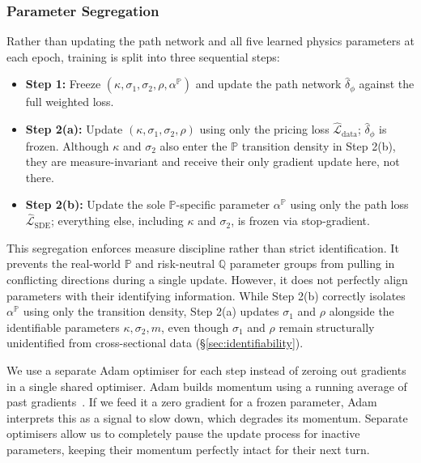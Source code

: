 \documentclass[sigconf, authorversion=true, nonacm=true]{acmart}
\begin{document}
\subsubsection{Parameter Segregation}
\label{sec:alternating}

Rather than updating the path network and all five learned physics
parameters at each epoch, training is split into three sequential steps:
\begin{itemize}
    \item \textbf{Step 1:} Freeze $(\kappa, \sigma_1, \sigma_2, \rho,
    \alpha^{\mathbb{P}})$ and update the path network $\hat{\delta}_{\phi}$
    against the full weighted loss.
    \item \textbf{Step 2(a):} Update $(\kappa, \sigma_1, \sigma_2, \rho)$
    using only the pricing loss $\hat{\mathcal{L}}_{\text{data}}$;
    $\hat{\delta}_{\phi}$ is frozen. Although $\kappa$ and $\sigma_2$ also
    enter the $\mathbb{P}$ transition density in Step 2(b), they are
    measure-invariant and receive their only gradient update here, not there.
    \item \textbf{Step 2(b):} Update the sole $\mathbb{P}$-specific parameter
    $\alpha^{\mathbb{P}}$ using only the path loss
    $\hat{\mathcal{L}}_{\text{SDE}}$; everything else, including $\kappa$ and
    $\sigma_2$, is frozen via stop-gradient.
\end{itemize}
This segregation enforces measure discipline rather than strict identification. It prevents the real-world $\mathbb{P}$ and risk-neutral $\mathbb{Q}$ parameter groups from pulling in conflicting directions during a single update. However, it does not perfectly align parameters with their identifying information. While Step 2(b) correctly isolates $\alpha^{\mathbb{P}}$ using only the transition density, Step 2(a) updates $\sigma_1$ and $\rho$ alongside the identifiable parameters $\kappa, \sigma_2, m$, even though $\sigma_1$ and $\rho$ remain structurally unidentified from cross-sectional data (\S\ref{sec:identifiability}).

We use a separate Adam optimiser for each step instead of zeroing out gradients in a single shared optimiser. Adam builds momentum using a running average of past gradients~\cite{kingma2014adam}. If we feed it a zero gradient for a frozen parameter, Adam interprets this as a signal to slow down, which degrades its momentum. Separate optimisers allow us to completely pause the update process for inactive parameters, keeping their momentum perfectly intact for their next turn.
\end{document}
